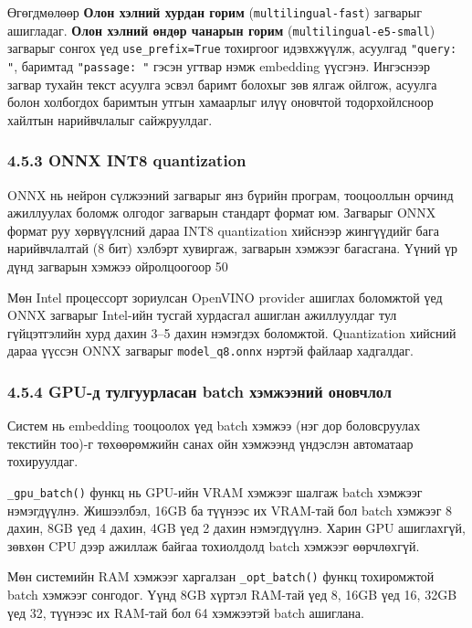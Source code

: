 \documentclass[11pt,a4paper]{article}
\begin{document}
Өгөгдмөлөөр \textbf{Олон хэлний хурдан горим} (\texttt{multilingual-fast}) загварыг ашигладаг. \textbf{Олон хэлний өндөр чанарын горим} (\texttt{multilingual-e5-small}) загварыг сонгох үед \texttt{use\_prefix=True} тохиргоог идэвхжүүлж, асуулгад \texttt{"query: "}, баримтад \texttt{"passage: "} гэсэн угтвар нэмж embedding үүсгэнэ. Ингэснээр загвар тухайн текст асуулга эсвэл баримт болохыг зөв ялгаж ойлгож, асуулга болон холбогдох баримтын утгын хамаарлыг илүү оновчтой тодорхойлсноор хайлтын нарийвчлалыг сайжруулдаг.

\subsubsection*{4.5.3 ONNX INT8 quantization}

ONNX нь нейрон сүлжээний загварыг янз бүрийн програм, тооцооллын орчинд ажиллуулах боломж олгодог загварын стандарт формат юм. Загварыг ONNX формат руу хөрвүүлсний дараа INT8 quantization хийснээр жингүүдийг бага нарийвчлалтай (8 бит) хэлбэрт хувиргаж, загварын хэмжээг багасгана. Үүний үр дүнд загварын хэмжээ ойролцоогоор 50%

Мөн Intel процессорт зориулсан OpenVINO provider ашиглах боломжтой үед ONNX загварыг Intel-ийн тусгай хурдасгал ашиглан ажиллуулдаг тул гүйцэтгэлийн хурд дахин 3–5 дахин нэмэгдэх боломжтой. Quantization хийсний дараа үүссэн ONNX загварыг \texttt{model\_q8.onnx} нэртэй файлаар хадгалдаг.

\subsubsection*{4.5.4 GPU-д тулгуурласан batch хэмжээний оновчлол}

Систем нь embedding тооцоолох үед batch хэмжээ (нэг дор боловсруулах текстийн тоо)-г төхөөрөмжийн санах ойн хэмжээнд үндэслэн автоматаар тохируулдаг.

\texttt{\_gpu\_batch()} функц нь GPU-ийн VRAM хэмжээг шалгаж batch хэмжээг нэмэгдүүлнэ. Жишээлбэл, 16GB ба түүнээс их VRAM-тай бол batch хэмжээг 8 дахин, 8GB үед 4 дахин, 4GB үед 2 дахин нэмэгдүүлнэ. Харин GPU ашиглахгүй, зөвхөн CPU дээр ажиллаж байгаа тохиолдолд batch хэмжээг өөрчлөхгүй.

Мөн системийн RAM хэмжээг харгалзан \texttt{\_opt\_batch()} функц тохиромжтой batch хэмжээг сонгодог. Үүнд 8GB хүртэл RAM-тай үед 8, 16GB үед 16, 32GB үед 32, түүнээс их RAM-тай бол 64 хэмжээтэй batch ашиглана.
\end{document}
